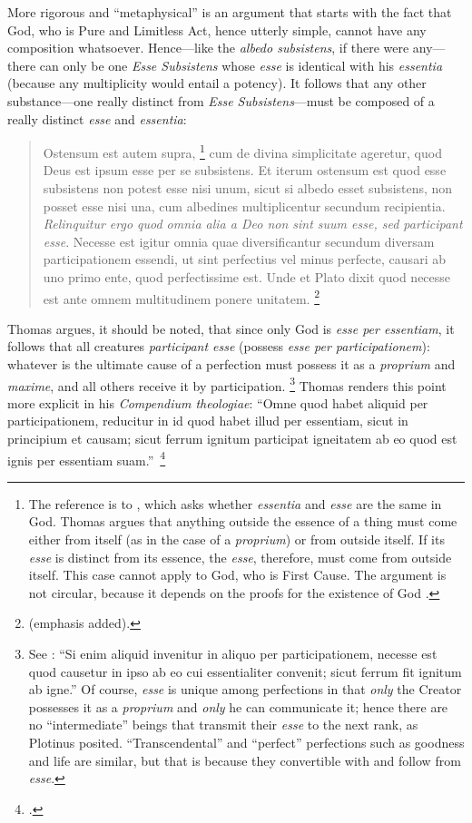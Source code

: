 More rigorous and ``metaphysical'' is an argument that starts with the fact that God, who is Pure and Limitless Act, hence utterly simple, cannot have any composition whatsoever. Hence---like the \emph{albedo subsistens}, if there were any---there can only be one \emph{Esse Subsistens} whose \emph{esse} is identical with his \emph{essentia} (because any multiplicity would entail a potency). It follows that any other substance---one really distinct from \emph{Esse Subsistens}---must be composed of a really distinct \emph{esse} and \emph{essentia}:
\begin{quotation}
Ostensum est autem supra,%
%
\footnote{The reference is to \cite[I, q.~3, a.~4]{st:summa}, which asks whether \emph{essentia} and \emph{esse} are the same in God. Thomas argues that anything outside the essence of a thing must come either from itself (as in the case of a \emph{proprium}) or from outside itself. If its \emph{esse} is distinct from its essence, the \emph{esse}, therefore, must come from outside itself. This case cannot apply to God, who is First Cause. The argument is not circular, because it depends on the proofs for the existence of God \parencite[I, q.~2, a.~3]{st:summa}.}
%
cum de divina simplicitate ageretur, quod Deus est ipsum esse per se subsistens. Et iterum ostensum est quod esse subsistens non potest esse nisi unum, sicut si albedo esset subsistens, non posset esse nisi una, cum albedines multiplicentur secundum recipientia. \emph{Relinquitur ergo quod omnia alia a Deo non sint suum esse, sed participant esse}. Necesse est igitur omnia quae diversificantur secundum diversam participationem essendi, ut sint perfectius vel minus perfecte, causari ab uno primo ente, quod perfectissime est. Unde et Plato dixit quod necesse est ante omnem multitudinem ponere unitatem.%
%
\footnote{\Cite[I, q.~44, a.~1, co.]{st:summa} (emphasis added).}
%
\end{quotation}
Thomas argues, it should be noted, that since only God is \emph{esse per essentiam}, it follows that all creatures \emph{participant esse} (possess \emph{esse per participationem}): whatever is the ultimate cause of a perfection must possess it as a \emph{proprium} and \emph{maxime}, and all others receive it by participation.%
%
\footnote{See \cite[I, q.~44, a.~1, co.]{st:summa}{}: ``Si enim aliquid invenitur in aliquo per participationem, necesse est quod causetur in ipso ab eo cui essentialiter convenit; sicut ferrum fit ignitum ab igne.'' Of course, \emph{esse} is unique among perfections in that \emph{only} the Creator possesses it as a \emph{proprium} and \emph{only} he can communicate it; hence there are no ``intermediate'' beings that transmit their \emph{esse} to the next rank, as Plotinus posited. ``Transcendental'' and ``perfect'' perfections such as goodness and life are similar, but that is because they convertible with and follow from \emph{esse}.} Thomas renders this point more explicit in his \emph{Compendium theologiae}: ``Omne quod habet aliquid per participationem, reducitur in id quod habet illud per essentiam, sicut in principium et causam; sicut ferrum ignitum participat igneitatem ab eo quod est ignis per essentiam suam.''\,%
%
\footnote{\Cite[I,  cap.~68]{st:compendium}.} 

